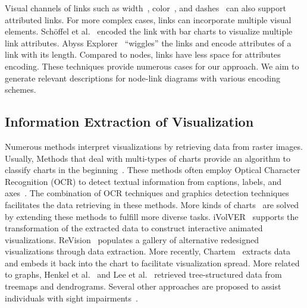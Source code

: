 Visual channels of links such as width~\cite{Katz_2015}, color~\cite{DBLP:journals/tvcg/Guo09}, and dashes~\cite{DBLP:journals/bmcbi/JunkerKS06} can also support attributed links.
For more complex cases, links can incorporate multiple visual elements.
Sch{\"{o}}ffel et al.~\cite{DBLP:conf/iv/SchoffelSE16} encoded the link with bar charts to visualize multiple link attributes.
Abyss Explorer~\cite{DBLP:journals/tvcg/NielsenJBJ09} ``wiggles'' the links and encode attributes of a link with its length.
Compared to nodes, links have less space for attributes encoding.
These techniques provide numerous cases for our approach. 
We aim to generate relevant descriptions for node-link diagrams with various encoding schemes.

\subsection{Information Extraction of Visualization}
Numerous methods interpret visualizations by retrieving data from raster images.
Usually, Methods that deal with multi-types of charts provide an algorithm to classify charts in the beginning~\cite{DBLP:conf/icip/GaoZB12, DBLP:conf/chi/JungKSHLKS17, DBLP:conf/eccv/SiegelHLDF16, DBLP:journals/vlc/DaiWNZ18}.
These methods often employ Optical Character Recognition (OCR) to detect textual information from captions, labels, and axes~\cite{DBLP:conf/icip/ZhouT00, DBLP:conf/doceng/HuangT07, DBLP:conf/grec/HuangTL03}.
The combination of OCR techniques and graphics detection techniques facilitates the data retrieving in these methods.
More kinds of charts~\cite{DBLP:conf/pkdd/ClicheRMY17, DBLP:conf/uist/SavvaKCFAH11} are solved by extending these methods to fulfill more diverse tasks.
iVolVER~\cite{DBLP:conf/chi/MendezNV16} supports the transformation of the extracted data to construct interactive animated visualizations.
ReVision~\cite{DBLP:conf/uist/SavvaKCFAH11} populates a gallery of alternative redesigned visualizations through data extraction.
More recently, Chartem~\cite{DBLP:journals/tvcg/FuZCGWZHTZM21} extracts data and embeds it back into the chart to facilitate visualization spread.
More related to graphs, Henkel et al.~\cite{DBLP:conf/vmv/HenkelKLG20} and Lee et al.~\cite{DBLP:conf/icdar/LeeYWH17} retrieved tree-structured data from treemaps and dendrograms.
Several other approaches are proposed to assist individuals with sight impairments~\cite{DBLP:conf/ismis/ChesterE05, DBLP:journals/tiis/CarberrySMDWGCSOM12, DBLP:journals/cgf/ChoiJPCE19}.


